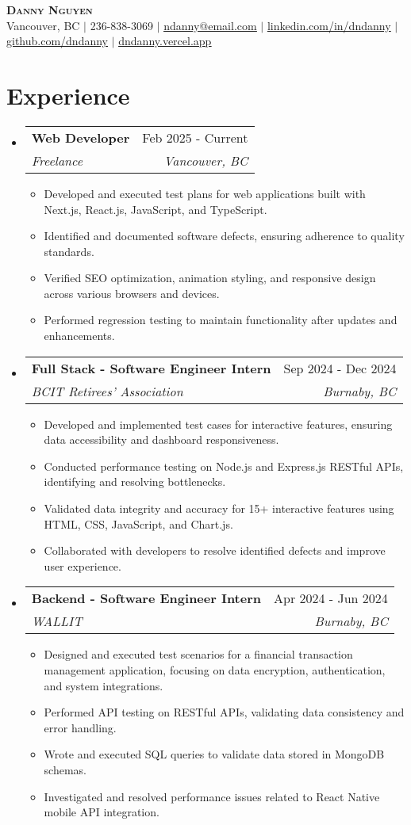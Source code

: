 \documentclass[letterpaper,11pt]{article}
\makeatletter
\newcommand{\resumeItem}[1]{
\item\small{
{#1 \vspace{-2pt}}
}
}
\newcommand{\resumeSubheading}[4]{
\vspace{-2pt}\item
\begin{tabular*}{0.97\textwidth}[t]{l@{\extracolsep{\fill}}r}
\textbf{#1} & #2 \\
\textit{\small#3} & \textit{\small #4} \\
\end{tabular*}\vspace{-7pt}
}
\newcommand{\resumeSubHeadingListStart}{\begin{itemize}[leftmargin=0.15in, label={}]}
\newcommand{\resumeSubHeadingListEnd}{\end{itemize}}
\newcommand{\resumeItemListStart}{\begin{itemize}}
\newcommand{\resumeItemListEnd}{\end{itemize}\vspace{-5pt}}
\makeatother
\begin{document}
\begin{center}
\textbf{\Huge \scshape Danny Nguyen} \\ \vspace{1pt}
\small Vancouver, BC $|$ 236-838-3069 $|$ \href{mailto:ndanny@email.com}{\underline{ndanny@email.com}} $|$
\href{https://linkedin.com/in/dndanny}{\underline{linkedin.com/in/dndanny}} $|$
\href{https://github.com/dndanny}{\underline{github.com/dndanny}} $|$
\href{https://dndanny.vercel.app}{\underline{dndanny.vercel.app}}
\end{center}


\section{Experience}
\resumeSubHeadingListStart
\resumeSubheading{Web Developer}{Feb 2025 - Current}{Freelance}{Vancouver, BC}
\resumeItemListStart
\resumeItem{Developed and executed test plans for web applications built with Next.js, React.js, JavaScript, and TypeScript.}
\resumeItem{Identified and documented software defects, ensuring adherence to quality standards.}
\resumeItem{Verified SEO optimization, animation styling, and responsive design across various browsers and devices.}
\resumeItem{Performed regression testing to maintain functionality after updates and enhancements.}
\resumeItemListEnd

\resumeSubheading{Full Stack - Software Engineer Intern}{Sep 2024 - Dec 2024}{BCIT Retirees' Association}{Burnaby, BC}
\resumeItemListStart
\resumeItem{Developed and implemented test cases for interactive features, ensuring data accessibility and dashboard responsiveness.}
\resumeItem{Conducted performance testing on Node.js and Express.js RESTful APIs, identifying and resolving bottlenecks.}
\resumeItem{Validated data integrity and accuracy for 15+ interactive features using HTML, CSS, JavaScript, and Chart.js.}
\resumeItem{Collaborated with developers to resolve identified defects and improve user experience.}
\resumeItemListEnd

\resumeSubheading{Backend - Software Engineer Intern}{Apr 2024 - Jun 2024}{WALLIT}{Burnaby, BC}
\resumeItemListStart
\resumeItem{Designed and executed test scenarios for a financial transaction management application, focusing on data encryption, authentication, and system integrations.}
\resumeItem{Performed API testing on RESTful APIs, validating data consistency and error handling.}
\resumeItem{Wrote and executed SQL queries to validate data stored in MongoDB schemas.}
\resumeItem{Investigated and resolved performance issues related to React Native mobile API integration.}
\resumeItemListEnd
\resumeSubHeadingListEnd
\end{document}
